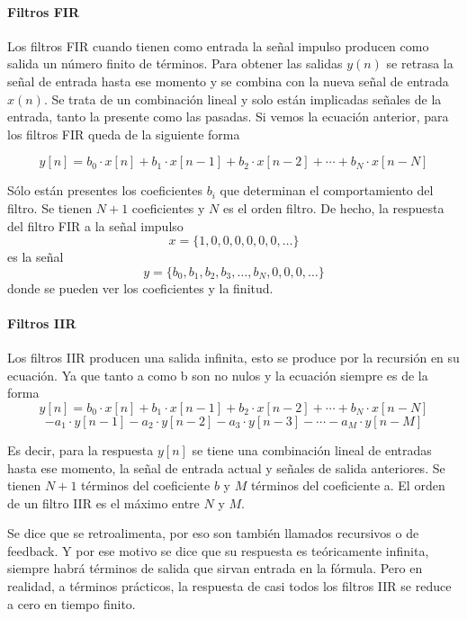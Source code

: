\paragraph{Filtros FIR}

Los filtros FIR cuando tienen como entrada la señal impulso producen como salida un número finito de términos. Para obtener las salidas $y(n)$ se retrasa la señal de entrada hasta ese momento y se combina con la nueva señal de entrada $x(n)$. Se trata de un combinación lineal y solo están implicadas señales de la entrada, tanto la presente como las pasadas.
Si vemos la ecuación anterior, para los filtros FIR queda de la siguiente forma

$$ y[n] = b_0 \cdot x[n] + b_1 \cdot x[n - 1] + b_2 \cdot x[n - 2] + \cdots + b_N \cdot x[n - N] $$

Sólo están presentes los coeficientes $b_i$ que determinan el comportamiento del filtro. Se tienen $N+1$ coeficientes y $N$ es el orden filtro. De hecho, la respuesta del filtro FIR a la señal impulso 
$$ x = \{1, 0, 0, 0, 0, 0, 0, \ldots \} $$
es la señal
$$ y = \{b_0, b_1, b_2, b_3, \ldots, b_N , 0, 0, 0, \ldots \}  $$
donde se pueden ver los coeficientes y la finitud.

\paragraph{Filtros IIR}

Los filtros IIR producen una salida infinita, esto se produce por la recursión en su ecuación. Ya que tanto a como b son no nulos y la ecuación siempre es de la forma
$$y[n] = b_0 \cdot x[n] + b_1 \cdot x[n - 1] + b_2 \cdot x[n - 2] + \cdots + b_N \cdot x[n - N]  $$
$$- a_1 \cdot y[n - 1] - a_2 \cdot y[n - 2] - a_3 \cdot y[n - 3] - \cdots - a_M \cdot y[n - M] $$
\label{eq:filterEqIIR}

Es decir, para la respuesta $y[n]$ se tiene una combinación lineal de entradas hasta ese momento, la señal de entrada actual y señales de salida anteriores. Se tienen $N+1$ términos del coeficiente $b$ y $M$ términos del coeficiente a. El orden de un filtro IIR es el máximo entre $N$ y $M$.

Se dice que se retroalimenta, por eso son también llamados recursivos o de feedback. Y por ese motivo se dice que su respuesta es teóricamente infinita, siempre habrá términos de salida que sirvan entrada en la fórmula. Pero en realidad, a términos prácticos, la respuesta de casi todos los filtros IIR se reduce a cero en tiempo finito.

